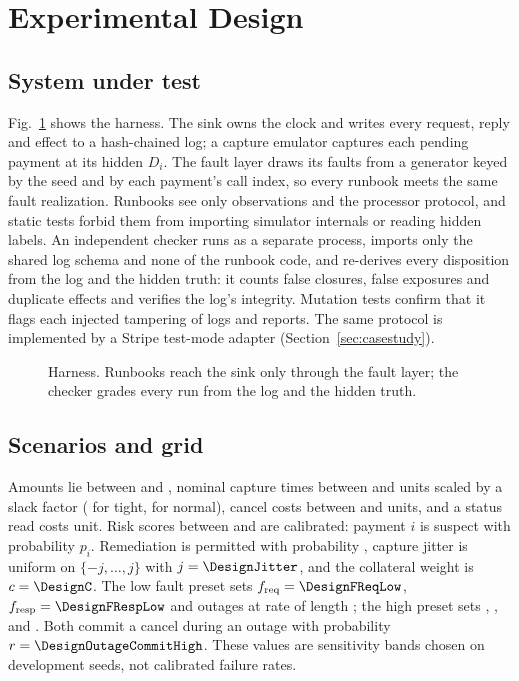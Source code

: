 \section{Experimental Design}\label{sec:design}

\subsection{System under test}
Fig.~\ref{fig:arch} shows the harness. The sink owns the clock and writes every request, reply and effect to a hash-chained log; a capture emulator captures each pending payment at its hidden $D_i$. The fault layer draws its faults from a generator keyed by the seed and by each payment's call index, so every runbook meets the same fault realization. Runbooks see only observations and the processor protocol, and static tests forbid them from importing simulator internals or reading hidden labels. An independent checker runs as a separate process, imports only the shared log schema and none of the runbook code, and re-derives every disposition from the log and the hidden truth: it counts false closures, false exposures and duplicate effects and verifies the log's integrity. Mutation tests confirm that it flags each injected tampering of logs and reports. The same protocol is implemented by a Stripe test-mode adapter (Section~\ref{sec:casestudy}).

\begin{figure}[t]
  \centering
  
  \caption{Harness. Runbooks reach the sink only through the fault layer; the checker grades every run from the log and the hidden truth.}
  \label{fig:arch}
\end{figure}

\subsection{Scenarios and grid}
Amounts lie between \DesignAmountMin{} and \DesignAmountMax{}, nominal capture times between \DesignDMin{} and \DesignDMax{} units scaled by a slack factor (\DesignSlackTight{} for tight, \DesignSlackNormal{} for normal), cancel costs between \DesignSMin{} and \DesignSMax{} units, and a status read costs \DesignQ{} unit. Risk scores between \DesignPMin{} and \DesignPMax{} are calibrated: payment $i$ is suspect with probability $p_i$. Remediation is permitted with probability \DesignPermitProb{}, capture jitter is uniform on $\{-j,\dots,j\}$ with $j = \DesignJitter$, and the collateral weight is $c = \DesignC$. The low fault preset sets $f_\mathrm{req} = \DesignFReqLow$, $f_\mathrm{resp} = \DesignFRespLow$ and outages at rate \DesignOutageRateLow{} of length \DesignOutageLengthLow; the high preset sets \DesignFReqHigh, \DesignFRespHigh, \DesignOutageRateHigh{} and \DesignOutageLengthHigh. Both commit a cancel during an outage with probability $r = \DesignOutageCommitHigh$. These values are sensitivity bands chosen on development seeds, not calibrated failure rates.

